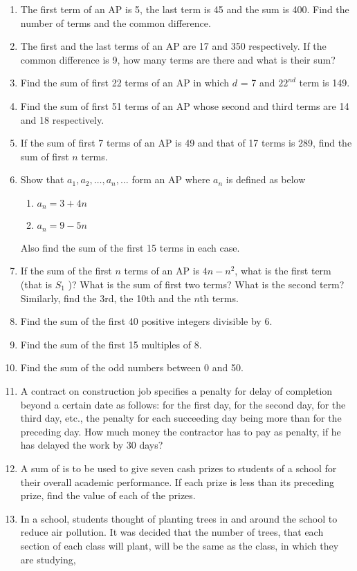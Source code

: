 \begin{enumerate}[label=\thesubsection.\arabic*, ref=\thesubsection.\theenumi]
\item The first term of an AP is 5,  the last term is 45 and the sum is 400. Find the number of terms and the common difference.
\item The first and the last terms of an AP are 17 and 350 respectively. If the common difference is 9,  how many terms are there and what is their sum?
\item Find the sum of first 22 terms of an AP in which $d$ = 7 and $22^{nd}$ term is 149.
\item Find the sum of first 51 terms of an AP whose second and third terms are 14 and 18 respectively.
\item If the sum of first 7 terms of an AP is 49 and that of 17 terms is 289,  find the sum of first $n$ terms. 
\item Show that $a_1 ,  a_2 ,  \dots,  a_n,  \dots$  form an AP where $a_n$ is defined as below 
\begin{enumerate}
	\item $a_n = 3 + 4n$
	\item $a_n = 9 - 5n$
\end{enumerate}
Also find the sum of the first 15 terms in each case.
\item If the sum of the first $n$ terms of an AP is $4n - n^2$,  what is the first term (that is $S_1$ )? What
is the sum of first two terms? What is the second term? Similarly,  find the 3rd,  the 10th and
the $n$th terms.
\item Find the sum of the first 40 positive integers divisible by 6.
\item Find the sum of the first 15 multiples of 8.
\item Find the sum of the odd numbers between 0 and 50.
\item A contract on construction job specifies a penalty for delay of completion beyond a
certain date as follows:  for the first day,  for the second day,   for the third
day,  etc.,  the penalty for each succeeding day being  more than for the preceding day. How much money the contractor has to pay as penalty,  if he has delayed the work by 30 days?
\item A sum of  is to be used to give seven cash prizes to students of a school for their overall academic performance. If each prize is  less than its preceding prize,  find the value of each of the prizes.
\item  In a school,  students thought of planting trees in and around the school to reduce air pollution. It was decided that the number of trees,  that each section of each class will plant,  will be the same as the class,  in which they are studying,  

\end{enumerate}
